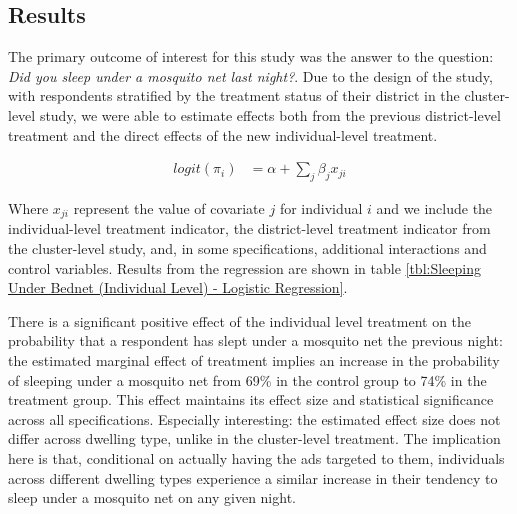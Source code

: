 \documentclass[a4paper,12pt]{article}
\begin{document}

\subsection{Results}

The primary outcome of interest for this study was the answer to the question: \textit{Did you sleep under a mosquito net last night?}. Due to the design of the study, with respondents stratified by the treatment status of their district in the cluster-level study, we were able to estimate effects both from the previous district-level treatment and the direct effects of the new individual-level treatment.


\begin{align*}
  logit(\pi_{i}) &= \alpha + \sum_j \beta_j x_{ji}
\end{align*}

Where $x_{ji}$ represent the value of covariate $j$ for individual $i$ and we include the individual-level treatment indicator, the district-level treatment indicator from the cluster-level study, and, in some specifications, additional interactions and control variables. Results from the regression are shown in table \ref{tbl:Sleeping Under Bednet (Individual Level) - Logistic Regression}.

There is a significant positive effect of the individual level treatment on the probability that a respondent has slept under a mosquito net the previous night: the estimated marginal effect of treatment implies an increase in the probability of sleeping under a mosquito net from 69\% in the control group to 74\% in the treatment group. This effect maintains its effect size and statistical significance across all specifications. Especially interesting: the estimated effect size does not differ across dwelling type, unlike in the cluster-level treatment. The implication here is that, conditional on actually having the ads targeted to them, individuals across different dwelling types experience a similar increase in their tendency to sleep under a mosquito net on any given night.






\clearpage
\printbibliography
\end{document}
